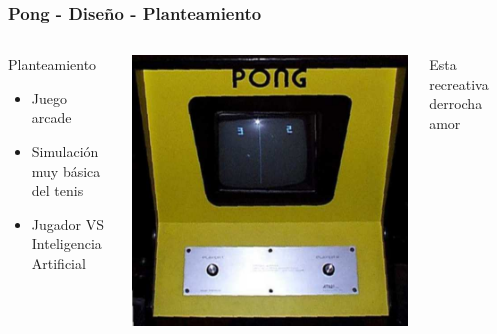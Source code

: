 \begin{frame}
	\frametitle{Pong - Diseño - Planteamiento}
	
	\begin{columns}[c]
	\column{175pt}	
	
	\begin{block}{Planteamiento}
		\begin{itemize}
			\item Juego arcade
			\item Simulación muy básica del tenis
			\item Jugador VS Inteligencia Artificial
		\end{itemize}            
	\end{block}
	
	\column{125pt}
	
	\begin{center}
		\includegraphics[scale=0.2]{img/pong-recreativa-2.jpg}
	\end{center}
	
	\begin{center}
	    Esta recreativa derrocha amor
	\end{center}	
	
	
	\end{columns}
	
\end{frame}


